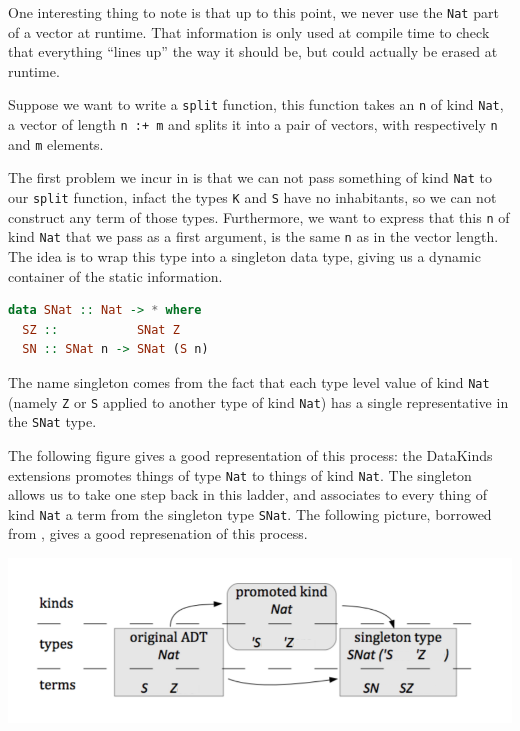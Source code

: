 \documentclass[11pt]{article}
\begin{document}
One interesting thing to note is that up to this point, we never use the
\texttt{Nat} part of a vector at runtime. That information is only used
at compile time to check that everything ``lines up'' the way it should
be, but could actually be erased at runtime.

Suppose we want to write a \texttt{split} function, this function takes
an \texttt{n} of kind \texttt{Nat}, a vector of length \texttt{n\ :+\ m}
and splits it into a pair of vectors, with respectively \texttt{n} and
\texttt{m} elements.

The first problem we incur in is that we can not pass something of kind
\texttt{Nat} to our \texttt{split} function, infact the types \texttt{K} and \texttt{S} have no inhabitants, so we can
not construct any term of those types. Furthermore, we want to
express that this \texttt{n} of kind \texttt{Nat} that we pass as a
first argument, is the same \texttt{n} as in the vector length. The idea is to 
wrap this type into a singleton data type, giving us a dynamic container of the static 
information.

\begin{lstlisting}[language=haskell]
data SNat :: Nat -> * where
  SZ ::           SNat Z
  SN :: SNat n -> SNat (S n)
\end{lstlisting}

The name singleton comes from the fact that each type level value of
kind \texttt{Nat} (namely \texttt{Z} or \texttt{S} applied to another
type of kind \texttt{Nat}) has a single representative in the
\texttt{SNat} type.

The following figure gives a good representation of this process: the
DataKinds extensions promotes things of type \texttt{Nat} to things of
kind \texttt{Nat}. The singleton allows us to take one step back in this
ladder, and associates to every thing of kind \texttt{Nat} a term from
the singleton type \texttt{SNat}. The following picture, borrowed from \cite{singletons}, gives a good 
represenation of this process.

\includegraphics[width=\textwidth]{singleton.png}
\end{document}
